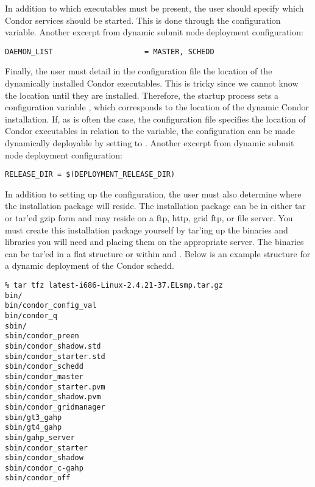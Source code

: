 In addition to which executables must be present, the user should
specify which Condor services should be started.  This is done through
the  configuration variable.  Another excerpt
from dynamic submit node deployment configuration:

\footnotesize
\begin{verbatim}
DAEMON_LIST                     = MASTER, SCHEDD
\end{verbatim}
\normalsize

Finally, the user must detail in the configuration file the location
of the dynamically installed Condor executables.  This is tricky since
we cannot know the location until they are installed.  Therefore, the
startup process sets a configuration variable
, which corresponds to the location of
the dynamic Condor installation.  If, as is often the case, the
configuration file specifies the location of Condor executables in
relation to the  variable, the configuration can
be made dynamically deployable by setting  to
.  Another excerpt from dynamic
submit node deployment configuration:

\footnotesize
\begin{verbatim}
RELEASE_DIR = $(DEPLOYMENT_RELEASE_DIR)
\end{verbatim}
\normalsize

In addition to setting up the configuration, the user must also
determine where the installation package will reside.  The
installation package can be in either tar or tar'ed gzip form and may
reside on a ftp, http, grid ftp, or file server.  You must create this
installation package yourself by tar'ing up the binaries and libraries
you will need and placing them on the appropriate server.  The
binaries can be tar'ed in a flat structure or within  and
.  Below is an example structure for a dynamic deployment
of the Condor schedd.

\footnotesize
\begin{verbatim}
% tar tfz latest-i686-Linux-2.4.21-37.ELsmp.tar.gz
bin/
bin/condor_config_val
bin/condor_q
sbin/
sbin/condor_preen
sbin/condor_shadow.std
sbin/condor_starter.std
sbin/condor_schedd
sbin/condor_master
sbin/condor_starter.pvm
sbin/condor_shadow.pvm
sbin/condor_gridmanager
sbin/gt3_gahp
sbin/gt4_gahp
sbin/gahp_server
sbin/condor_starter
sbin/condor_shadow
sbin/condor_c-gahp
sbin/condor_off 
\end{verbatim}
\normalsize
